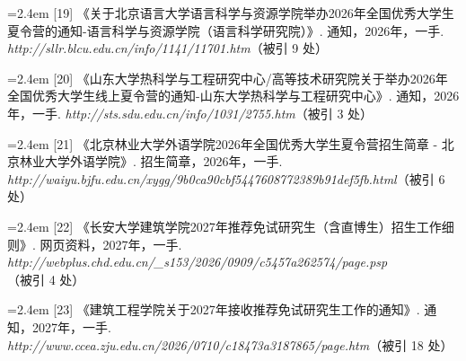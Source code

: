 {\vspace{0.6pt}
\vspace{3.5pt}\par
\nopagebreak\vspace{1pt}
\noindent\hangindent=2.4em \label{src:S0021}{\color{cAccent}[19]} 《关于北京语言大学语言科学与资源学院举办2026年全国优秀大学生夏令营的通知-语言科学与资源学院（语言科学研究院）》. 通知，2026年，一手. \textit{http://sllr.blcu.edu.cn/info/1141/11701.htm}（被引 9 处）\par
\vspace{0.6pt}
\vspace{3.5pt}\par
\nopagebreak\vspace{1pt}
\noindent\hangindent=2.4em \label{src:S0022}{\color{cAccent}[20]} 《山东大学热科学与工程研究中心/高等技术研究院关于举办2026年全国优秀大学生线上夏令营的通知-山东大学热科学与工程研究中心》. 通知，2026年，一手. \textit{http://sts.sdu.edu.cn/info/1031/2755.htm}（被引 3 处）\par
\vspace{0.6pt}
\vspace{3.5pt}\par
\nopagebreak\vspace{1pt}
\noindent\hangindent=2.4em \label{src:S0023}{\color{cAccent}[21]} 《北京林业大学外语学院2026年全国优秀大学生夏令营招生简章 - 北京林业大学外语学院》. 招生简章，2026年，一手. \textit{http://waiyu.bjfu.edu.cn/xygg/9b0ca90cbf5447608772389b91def5fb.html}（被引 6 处）\par
\vspace{0.6pt}
\vspace{3.5pt}\par
\nopagebreak\vspace{1pt}
\noindent\hangindent=2.4em \label{src:S0024}{\color{cAccent}[22]} 《长安大学建筑学院2027年推荐免试研究生（含直博生）招生工作细则》. 网页资料，2027年，一手. \textit{http://webplus.chd.edu.cn/\_s153/2026/0909/c5457a262574/page.psp}（被引 4 处）\par
\vspace{0.6pt}
\vspace{3.5pt}\par
\nopagebreak\vspace{1pt}
\noindent\hangindent=2.4em \label{src:S0025}{\color{cAccent}[23]} 《建筑工程学院关于2027年接收推荐免试研究生工作的通知》. 通知，2027年，一手. \textit{http://www.ccea.zju.edu.cn/2026/0710/c18473a3187865/page.htm}（被引 18 处）\par
}
